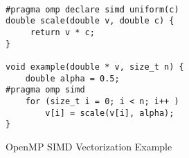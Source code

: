 \begin{figure}
\begin{verbatim}

#pragma omp declare simd uniform(c)
double scale(double v, double c) {
     return v * c;
}

void example(double * v, size_t n) {
    double alpha = 0.5;
#pragma omp simd
    for (size_t i = 0; i < n; i++ )
        v[i] = scale(v[i], alpha);
}
\end{verbatim}
\caption{OpenMP SIMD Vectorization Example\label{fig:simd-example}}
\end{figure}




